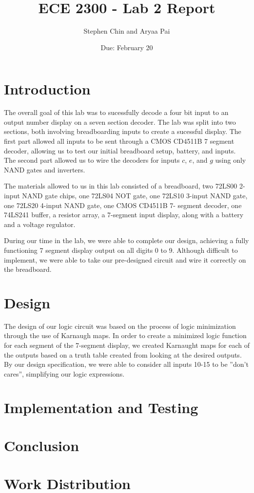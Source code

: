 \documentclass{article}
\title{ECE 2300 - Lab 2 Report}
\author{Stephen Chin and Aryaa Pai}
\date{Due: February 20}
\begin{document}
\maketitle



\section{Introduction}

The overall goal of this lab was to sucessfully decode a four bit
input to an output number display on a seven section decoder. The lab
was split into two sections, both involving breadboarding inputs to
create a sucessful display. The first part allowed all inputs to be
sent through a CMOS CD4511B 7 segment decoder, allowing us to test our
initial breadboard setup, battery, and inputs. The second part allowed
us to wire the decoders for inputs $c$, $e$, and $g$ using only NAND
gates and inverters.

The materials allowed to us in this lab consisted of a breadboard, two
72LS00 2-input NAND gate chips, one 72LS04 NOT gate, one 72LS10
3-input NAND gate, one 72LS20 4-input NAND gate, one CMOS CD4511B 7-
segment decoder, one 74LS241 buffer, a resistor array, a 7-segment
input display, along with a battery and a voltage regulator.

During our time in the lab, we were able to complete our design,
achieving a fully functioning 7 segment display output on all digits 0
to 9. Although difficult to implement, we were able to take our
pre-designed circuit and wire it correctly on the breadboard.


\section{Design}


The design of our logic circuit was based on the process of logic
minimization through the use of Karnaugh maps. In order to create a
minimized logic function for each segment of the 7-segment display, we
created Karnaught maps for each of the outputs based on a truth table
created from looking at the desired outputs. By our design
specification, we were able to consider all inputs 10-15 to be ''don't
cares'', simplifying our logic expressions.



\section{Implementation and Testing}



\section{Conclusion}



\section{Work Distribution}
\end{document}
